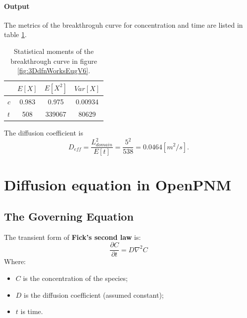 \documentclass{article}
\begin{document}
\FloatBarrier  %
\paragraph{Output} The metrics of the breakthroguh curve for concentration and time are listed in table \ref{tab:StatMomV6}.
\begin{table}[h!]
\centering
\begin{tabular}{lccc}
\toprule
        & $ E[X]$ & $E[X^2]$ & $Var[X]$ \\
\midrule
$c$     & 0.983        & 0.975           & 0.00934           \\
$t$     & 508          & 339067          & 80629             \\
\bottomrule
\end{tabular}
\caption{Statistical moments of the breakthrough curve in figure \ref{fig:3DdfnWorksEugV6}.}
\label{tab:StatMomV6}
\end{table}
The diffusion coefficient is
\[ D_{eff} = \frac{L_{domain}^2}{E[t]} = \frac{5^2}{538} = 0.0464 [m^2/s]. \]

\FloatBarrier  %
\section{Diffusion equation in OpenPNM}

\subsection{The Governing Equation}
The transient form of \textbf{Fick's second law} is:
\begin{equation}
    \frac{\partial C}{\partial t} = D \nabla^2 C
\end{equation}
Where:
\begin{itemize}
    \item $C$ is the concentration of the species;
    \item $D$ is the diffusion coefficient (assumed constant);
    \item $t$ is time.
\end{itemize}
\end{document}
